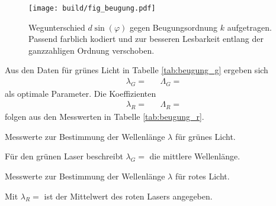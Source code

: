 \begin{figure}[H]
	\texttt{[image: build/fig\_beugung.pdf]}
	\captionsetup{width=0.997\linewidth}
	\caption{Wegunterschied $d \sin(\varphi)$ gegen Beugungsordnung $k$ aufgetragen. Passend farblich kodiert und zur besseren
			 Lesbarkeit entlang der ganzzahligen Ordnung verschoben.}
	\label{fig:beugung}
\end{figure}

Aus den Daten für grünes Licht in Tabelle \ref{tab:beugung_g} ergeben sich
\begin{align*}
	\lambda_G =  && \Lambda_G = 
\end{align*}
als optimale Parameter. Die Koeffizienten
\begin{align*}
	\lambda_R =  && \Lambda_R = 
\end{align*}
folgen aus den Messwerten in Tabelle \ref{tab:beugung_r}.
\newpage

\begin{table}[H]
	\centering
	\caption{Messwerte zur Bestimmung der Wellenlänge $\lambda$ für grünes Licht.}
	
	\label{tab:beugung_g}
\end{table}

Für den grünen Laser beschreibt $\lambda_G = $ die mittlere Wellenlänge.

\begin{table}[H]
	\centering
	\caption{Messwerte zur Bestimmung der Wellenlänge $\lambda$ für rotes Licht.}
	
	\label{tab:beugung_r}
\end{table}

Mit $\lambda_R = $ ist der Mittelwert des roten Lasers angegeben.

\newpage
